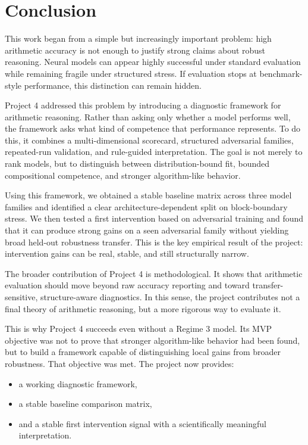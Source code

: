 \documentclass[11pt]{article}
\begin{document}
\section{Conclusion}

This work began from a simple but increasingly important problem: high arithmetic accuracy is not enough to justify strong claims about robust reasoning. Neural models can appear highly successful under standard evaluation while remaining fragile under structured stress. If evaluation stops at benchmark-style performance, this distinction can remain hidden.

Project 4 addressed this problem by introducing a diagnostic framework for arithmetic reasoning. Rather than asking only whether a model performs well, the framework asks what kind of competence that performance represents. To do this, it combines a multi-dimensional scorecard, structured adversarial families, repeated-run validation, and rule-guided interpretation. The goal is not merely to rank models, but to distinguish between distribution-bound fit, bounded compositional competence, and stronger algorithm-like behavior.

Using this framework, we obtained a stable baseline matrix across three model families and identified a clear architecture-dependent split on block-boundary stress. We then tested a first intervention based on adversarial training and found that it can produce strong gains on a seen adversarial family without yielding broad held-out robustness transfer. This is the key empirical result of the project: intervention gains can be real, stable, and still structurally narrow.

The broader contribution of Project 4 is methodological. It shows that arithmetic evaluation should move beyond raw accuracy reporting and toward transfer-sensitive, structure-aware diagnostics. In this sense, the project contributes not a final theory of arithmetic reasoning, but a more rigorous way to evaluate it.

This is why Project 4 succeeds even without a Regime 3 model. Its MVP objective was not to prove that stronger algorithm-like behavior had been found, but to build a framework capable of distinguishing local gains from broader robustness. That objective was met. The project now provides:
\begin{itemize}[leftmargin=1.5em]
    \item a working diagnostic framework,
    \item a stable baseline comparison matrix,
    \item and a stable first intervention signal with a scientifically meaningful interpretation.
\end{itemize}
\end{document}
